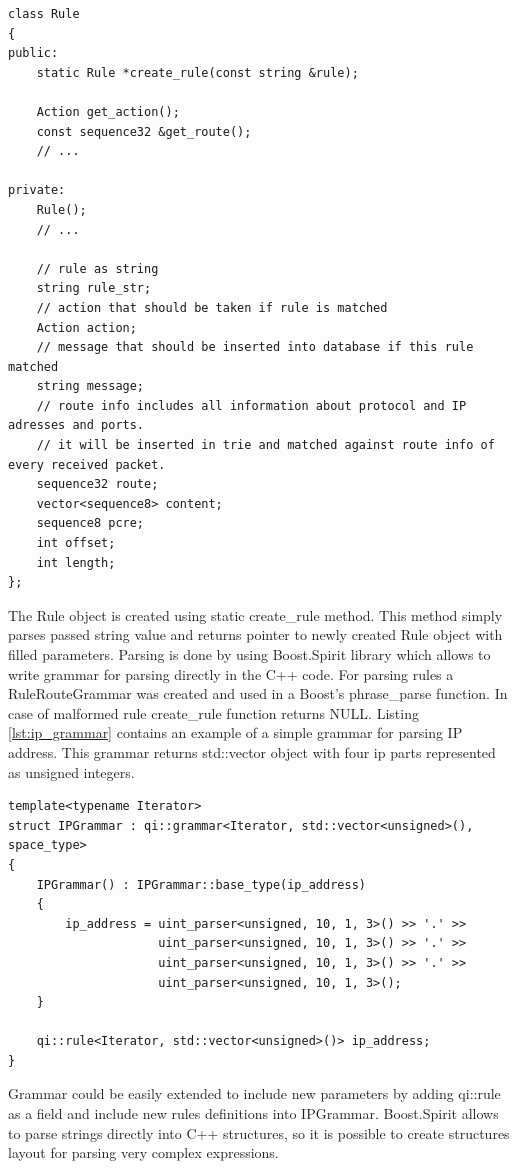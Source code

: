 \documentclass[thesis=M,english]{FITthesis}[2011/07/15]
\begin{document}
\begin{lstlisting}
class Rule
{
public:
    static Rule *create_rule(const string &rule);

    Action get_action();
    const sequence32 &get_route();
    // ...

private:
    Rule();
    // ...

    // rule as string
    string rule_str;
    // action that should be taken if rule is matched
    Action action;
    // message that should be inserted into database if this rule matched
    string message;
    // route info includes all information about protocol and IP adresses and ports.
    // it will be inserted in trie and matched against route info of every received packet.
    sequence32 route;
    vector<sequence8> content;
    sequence8 pcre;
    int offset;
    int length;
};

\end{lstlisting}

The Rule object is created using static create\_rule method. This method simply parses passed string value and returns pointer to newly created Rule object with filled parameters. Parsing is done by using Boost.Spirit library which allows to write grammar for parsing directly in the C++ code. For parsing rules a RuleRouteGrammar was created and used in a Boost's phrase\_parse function. In case of malformed rule create\_rule function returns NULL. Listing \ref{lst:ip_grammar} contains an example of a simple grammar for parsing IP address. This grammar returns std::vector object with four ip parts represented as unsigned integers.

\begin{lstlisting}
template<typename Iterator>
struct IPGrammar : qi::grammar<Iterator, std::vector<unsigned>(), space_type>
{
    IPGrammar() : IPGrammar::base_type(ip_address)
    {
        ip_address = uint_parser<unsigned, 10, 1, 3>() >> '.' >> 
                     uint_parser<unsigned, 10, 1, 3>() >> '.' >> 
                     uint_parser<unsigned, 10, 1, 3>() >> '.' >> 
                     uint_parser<unsigned, 10, 1, 3>();
    }

    qi::rule<Iterator, std::vector<unsigned>()> ip_address;
}
\end{lstlisting}

Grammar could be easily extended to include new parameters by adding qi::rule as a field and include new rules definitions into IPGrammar. Boost.Spirit allows to parse strings directly into C++ structures, so it is possible to create structures layout for parsing very complex expressions.
\end{document}
